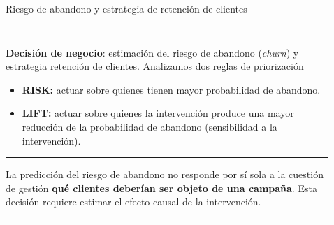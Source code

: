 \documentclass[
  8pt,
  ignorenonframetext,
  aspectratio=169,
  spanish,
]{beamer}
\providecommand{\tightlist}{%
  \setlength{\itemsep}{0pt}\setlength{\parskip}{0pt}}
\begin{document}
\begin{frame}[shrink]{Riesgo de abandono y estrategia de retención de
clientes}
\label{riesgo-de-abandono-y-estrategia-de-retenciuxf3n-de-clientes}
~

\begin{columns}[T]
\begin{column}{0.3\linewidth}
\begin{center}\rule{0.5\linewidth}{0.5pt}\end{center}

\textbf{Decisión de negocio}: estimación del riesgo de abandono
(\emph{churn}) y estrategia retención de clientes. Analizamos dos reglas
de priorización

\begin{itemize}
\tightlist
\item
  \textbf{RISK:} actuar sobre quienes tienen mayor probabilidad de
  abandono.\\
\item
  \textbf{LIFT:} actuar sobre quienes la intervención produce una mayor
  reducción de la probabilidad de abandono (sensibilidad a la
  intervención).
\end{itemize}

\begin{center}\rule{0.5\linewidth}{0.5pt}\end{center}

La predicción del riesgo de abandono no responde por sí sola a la
cuestión de gestión \textbf{qué clientes deberían ser objeto de una
campaña}. Esta decisión requiere estimar el efecto causal de la
intervención.

\begin{center}\rule{0.5\linewidth}{0.5pt}\end{center}
\end{column}

\begin{column}{0.05\linewidth}
\end{column}

\begin{column}{0.65\linewidth}
\begin{tcolorbox}[enhanced jigsaw, arc=.35mm, bottomtitle=1mm, colbacktitle=quarto-callout-note-color!10!white, breakable, toprule=.15mm, coltitle=black, colback=white, rightrule=.15mm, colframe=quarto-callout-note-color-frame, leftrule=.75mm, toptitle=1mm, opacitybacktitle=0.6, opacityback=0, title={Experimentos aleatorios controlados: el patrón de referencia}, titlerule=0mm, bottomrule=.15mm, left=2mm]


\end{tcolorbox}
\end{column}
\end{columns}
\end{frame}
\end{document}
